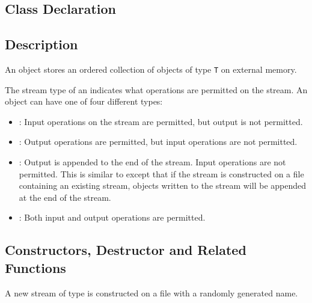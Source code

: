 \subsection{Class Declaration}
  \btabb
     {}
  \etabb

\subsection{Description}
An  object stores an ordered collection of objects of
type {\tt T} on external memory.

The stream type of an  indicates what
operations are permitted on the stream.
An  object can have one of four different types:
\begin{itemize}
    
    \item {}: Input operations on
    the stream are permitted, but output is not permitted.
    
    \item {}: Output operations are
    permitted, but input operations are not permitted. 
    
    \item {}: Output is appended
    to the end of the stream. Input operations are not
    permitted. This is similar to
     except that if the stream is
    constructed on a file containing an existing stream,
    objects written to the stream will be appended at the
    end of the stream.

    \item {}: Both input and output
    operations are permitted.
\end{itemize}

\subsection{Constructors, Destructor and Related Functions}
  \btabb

     {A new stream of type
     is constructed on a file with a
    randomly generated name.}
 
